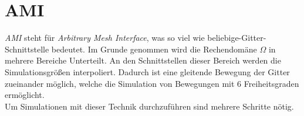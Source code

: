 \section{AMI}

\textit{AMI} steht für \textit{Arbitrary Mesh Interface}, was so viel wie beliebige-Gitter-Schnittstelle bedeutet. Im Grunde genommen wird die Rechendomäne $ \Omega $ in mehrere Bereiche Unterteilt. An den Schnittstellen dieser Bereich werden die Simulationsgrößen interpoliert. Dadurch ist eine gleitende Bewegung der Gitter zueinander möglich, welche die Simulation von Bewegungen mit 6 Freiheitsgraden ermöglicht.
\\
Um Simulationen mit dieser Technik durchzuführen sind mehrere Schritte nötig. 

\newpage